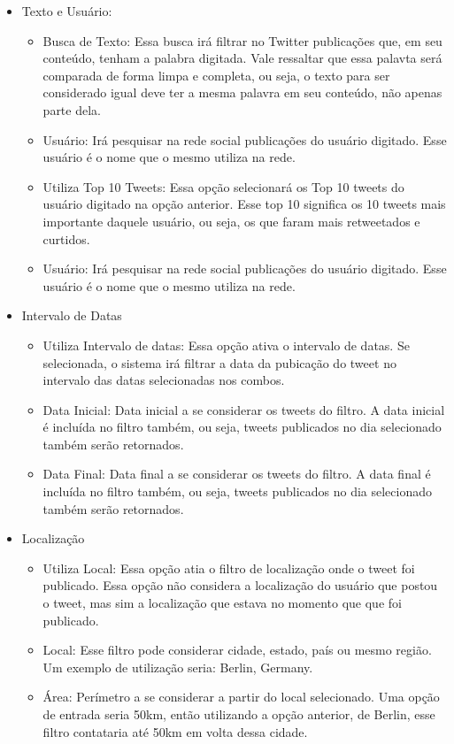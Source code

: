 \begin{itemize}
\item Texto e Usuário:

\begin{itemize}
\item Busca de Texto: Essa busca irá filtrar no Twitter publicações que, em seu conteúdo, tenham a palabra digitada. Vale ressaltar que essa palavta será comparada de forma limpa e completa, ou seja, o texto para ser considerado igual deve ter a mesma palavra em seu conteúdo, não apenas parte dela.
\item Usuário: Irá pesquisar na rede social publicações do usuário digitado. Esse usuário é o nome que o mesmo utiliza na rede.
\item Utiliza Top 10 Tweets: Essa opção selecionará os Top 10 tweets do usuário digitado na opção anterior. Esse top 10 significa os 10 tweets mais importante daquele usuário, ou seja, os que faram mais retweetados e curtidos.
\item Usuário: Irá pesquisar na rede social publicações do usuário digitado. Esse usuário é o nome que o mesmo utiliza na rede.
\end{itemize}

\item Intervalo de Datas

\begin{itemize}
\item Utiliza Intervalo de datas: Essa opção ativa o intervalo de datas. Se selecionada, o sistema irá filtrar a data da pubicação do tweet no intervalo das datas selecionadas nos combos.
\item Data Inicial: Data inicial a se considerar os tweets do filtro. A data inicial é incluída no filtro também, ou seja, tweets publicados no dia selecionado também serão retornados.
\item Data Final: Data final a se considerar os tweets do filtro. A data final é incluída no filtro também, ou seja, tweets publicados no dia selecionado também serão retornados.
\end{itemize}

\item Localização

\begin{itemize}
\item Utiliza Local: Essa opção atia o filtro de localização onde o tweet foi publicado. Essa opção não considera a localização do usuário que postou o tweet, mas sim a localização que estava no momento que que foi publicado.
\item Local: Esse filtro pode considerar cidade, estado, país ou mesmo região. Um exemplo de utilização seria: Berlin, Germany.
\item Área: Perímetro a se considerar a partir do local selecionado. Uma opção de entrada seria 50km, então utilizando a opção anterior, de Berlin, esse filtro contataria até 50km em volta dessa cidade. 


\end{itemize}
\end{itemize}
